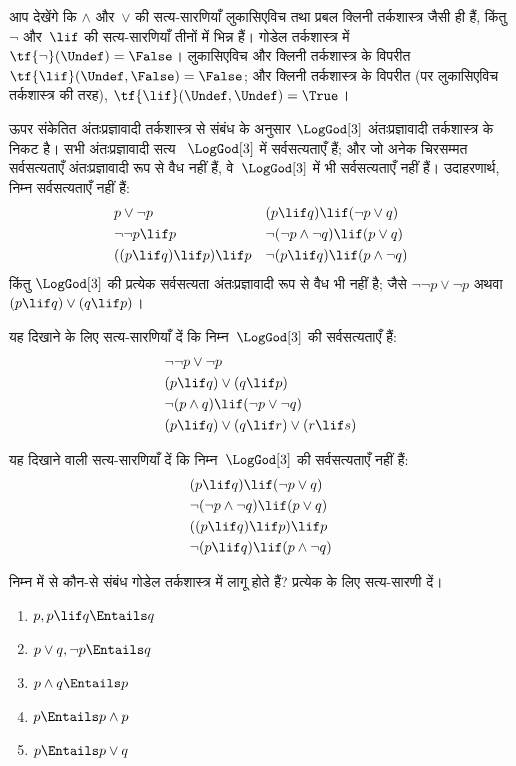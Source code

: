 \documentclass[../../../include/open-logic-section]{subfiles}
\begin{document}
आप देखेंगे कि $\land$ और~$\lor$ की सत्य-सारणियाँ लुकासिएविच तथा प्रबल
क्लिनी तर्कशास्त्र जैसी ही हैं, किंतु $\lnot$ और~$\lif$ की सत्य-सारणियाँ
तीनों में भिन्न हैं। गोडेल तर्कशास्त्र में $\tf{\lnot}(\Undef) = \False$।
लुकासिएविच और क्लिनी तर्कशास्त्र के विपरीत $\tf{\lif}(\Undef, \False) =
\False$; और क्लिनी तर्कशास्त्र के विपरीत (पर लुकासिएविच तर्कशास्त्र की
तरह), $\tf{\lif}(\Undef, \Undef) = \True$।

ऊपर संकेतित अंतःप्रज्ञावादी तर्कशास्त्र से संबंध के अनुसार $\LogGod[3]$
अंतःप्रज्ञावादी तर्कशास्त्र के निकट है। सभी अंतःप्रज्ञावादी सत्य
~$\LogGod[3]$ में सर्वसत्यताएँ हैं; और जो अनेक चिरसम्मत सर्वसत्यताएँ
अंतःप्रज्ञावादी रूप से वैध नहीं हैं, वे~$\LogGod[3]$ में भी सर्वसत्यताएँ
नहीं हैं। उदाहरणार्थ, निम्न सर्वसत्यताएँ नहीं हैं:
\begin{align*}
  & p \lor \lnot p && (p \lif q) \lif (\lnot p \lor q) \\
  & \lnot\lnot p \lif p && \lnot(\lnot p \land \lnot q) \lif (p \lor q) \\
  & ((p \lif q) \lif p) \lif p && \lnot(p \lif q) \lif (p \land \lnot q)
\end{align*}
किंतु $\LogGod[3]$ की प्रत्येक सर्वसत्यता अंतःप्रज्ञावादी रूप से वैध भी
नहीं है; जैसे $\lnot\lnot p \lor \lnot p$ अथवा $(p \lif q) \lor (q \lif
p)$।

\begin{prob}
  यह दिखाने के लिए सत्य-सारणियाँ दें कि निम्न~$\LogGod[3]$ की सर्वसत्यताएँ
  हैं:
  \begin{align*}
    & \lnot\lnot p \lor \lnot p\\
    & (p \lif q) \lor (q \lif p) \\
    & \lnot(p \land q) \lif (\lnot p \lor \lnot q) \\
    & (p \lif q) \lor (q \lif r) \lor (r \lif s)
  \end{align*}
\end{prob}

\begin{prob}
  यह दिखाने वाली सत्य-सारणियाँ दें कि निम्न~$\LogGod[3]$ की सर्वसत्यताएँ
  नहीं हैं:
  \begin{align*}
    & (p \lif q) \lif (\lnot p \lor q) \\
    & \lnot(\lnot p \land \lnot q) \lif (p \lor q) \\
    & ((p \lif q) \lif p) \lif p \\
    & \lnot(p \lif q) \lif (p \land \lnot q)
  \end{align*}
\end{prob}

\begin{prob}
  निम्न में से कौन-से संबंध गोडेल तर्कशास्त्र में लागू होते हैं? प्रत्येक
  के लिए सत्य-सारणी दें।
  \begin{enumerate}
    \item $p, p \lif q \Entails q$
    \item $p \lor q, \lnot p \Entails q$
    \item $p \land q \Entails p$
    \item $p \Entails p \land p$
    \item $p \Entails p \lor q$
  \end{enumerate}
\end{prob}
\end{document}
